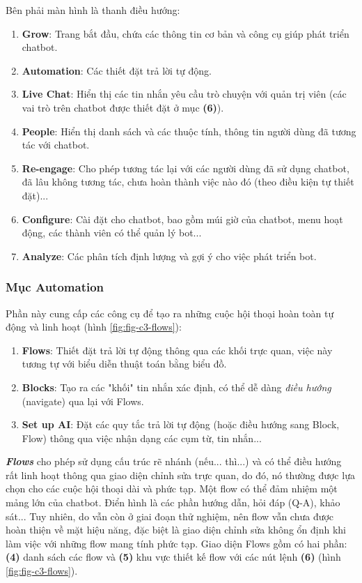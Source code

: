 Bên phải màn hình là thanh điều hướng:
\begin{enumerate}[label=\textbf{(\arabic*)},align=left,left=0cm..0cm,itemindent=*]
	\item \textbf{Grow}: Trang bắt đầu, chứa các thông tin cơ bản và công cụ giúp phát triển chatbot.
	\item \textbf{Automation}: Các thiết đặt trả lời tự động.
	\item \textbf{Live Chat}: Hiển thị các tin nhắn yêu cầu trò chuyện với quản trị viên (các vai trò trên chatbot được thiết đặt ở mục \textbf{(6)}).
	\item \textbf{People}: Hiển thị danh sách và các thuộc tính, thông tin người dùng đã tương tác với chatbot.
	\item \textbf{Re-engage}: Cho phép tương tác lại với các người dùng đã sử dụng chatbot, đã lâu không tương tác, chưa hoàn thành việc nào đó (theo điều kiện tự thiết đặt)...
	\item \textbf{Configure}: Cài đặt cho chatbot, bao gồm múi giờ của chatbot, menu hoạt động, các thành viên có thể quản lý bot...
	\item \textbf{Analyze}: Các phân tích định lượng và gợi ý cho việc phát triển bot.
\end{enumerate}

\subsubsection{Mục Automation}
Phần này cung cấp các công cụ để tạo ra những cuộc hội thoại hoàn toàn tự động và linh hoạt (hình \ref{fig:fig-c3-flows}):
\begin{enumerate}[label=\textbf{(\arabic*)},align=left,left=0cm..0cm,itemindent=*]
	\item \textbf{Flows}: Thiết đặt trả lời tự động thông qua các khối trực quan, việc này tương tự với biểu diễn thuật toán bằng biểu đồ.
	\item \textbf{Blocks}: Tạo ra các "khối" tin nhắn xác định, có thể dễ dàng \textit{điều hướng} (navigate) qua lại với Flows.
	\item \textbf{Set up AI}: Đặt các quy tắc trả lời tự động (hoặc điều hướng sang Block, Flow) thông qua việc nhận dạng các cụm từ, tin nhắn...
\end{enumerate}\par
\textbf{\textit{Flows}} cho phép sử dụng cấu trúc rẽ nhánh (nếu... thì...) và có thể điều hướng rất linh hoạt thông qua giao diện chỉnh sửa trực quan, do đó, nó thường được lựa chọn cho các cuộc hội thoại dài và phức tạp. Một flow có thể đảm nhiệm một mảng lớn của chatbot. Điển hình là các phần hướng dẫn, hỏi đáp (Q-A), khảo sát... Tuy nhiên, do vẫn còn ở giai đoạn thử nghiệm, nên flow vẫn chưa được hoàn thiện về mặt hiệu năng, đặc biệt là giao diện chỉnh sửa không ổn định khi làm việc với những flow mang tính phức tạp. Giao diện Flows gồm có hai phần: \textbf{(4)} danh sách các flow và \textbf{(5)} khu vực thiết kế flow với các nút lệnh \textbf{(6)} (hình \ref{fig:fig-c3-flows}).\par

